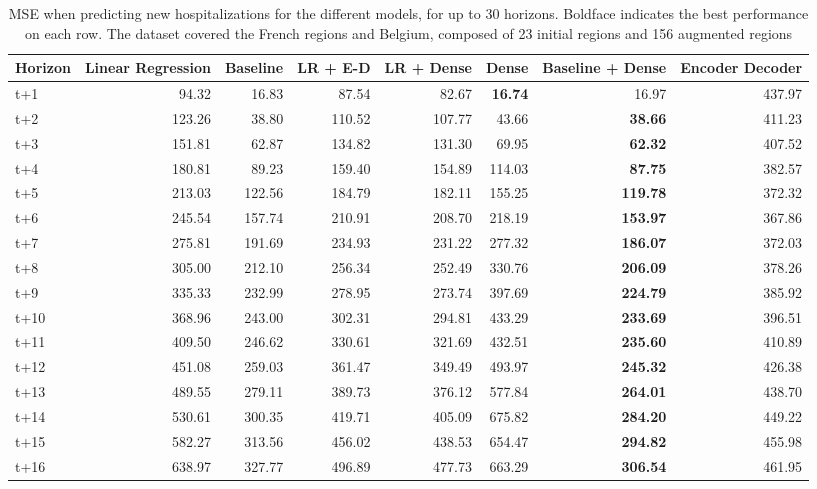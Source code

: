 \begin{table}[H]
\centering
\caption{MSE when predicting new hospitalizations for the different models, for up to 30 horizons. Boldface indicates the best performance on each row. The dataset covered the French regions and Belgium, composed of 23 initial regions and 156 augmented regions }
\label{tab:MSE_comparison}
\begin{tabular}{lrrrrrrr}
\toprule
Horizon &  Linear Regression &  Baseline &  LR + E-D &  LR + Dense &   Dense &  Baseline + Dense &  Encoder Decoder \\
\midrule
t+1  & 94.32  & 16.83  & 87.54  & 82.67  & \textbf{16.74}  & 16.97  & 437.97  \\
t+2  & 123.26  & 38.80  & 110.52  & 107.77  & 43.66  & \textbf{38.66}  & 411.23  \\
t+3  & 151.81  & 62.87  & 134.82  & 131.30  & 69.95  & \textbf{62.32}  & 407.52  \\
t+4  & 180.81  & 89.23  & 159.40  & 154.89  & 114.03  & \textbf{87.75}  & 382.57  \\
t+5  & 213.03  & 122.56  & 184.79  & 182.11  & 155.25  & \textbf{119.78}  & 372.32  \\
t+6  & 245.54  & 157.74  & 210.91  & 208.70  & 218.19  & \textbf{153.97}  & 367.86  \\
t+7  & 275.81  & 191.69  & 234.93  & 231.22  & 277.32  & \textbf{186.07}  & 372.03  \\
t+8  & 305.00  & 212.10  & 256.34  & 252.49  & 330.76  & \textbf{206.09}  & 378.26  \\
t+9  & 335.33  & 232.99  & 278.95  & 273.74  & 397.69  & \textbf{224.79}  & 385.92  \\
t+10  & 368.96  & 243.00  & 302.31  & 294.81  & 433.29  & \textbf{233.69}  & 396.51  \\
t+11  & 409.50  & 246.62  & 330.61  & 321.69  & 432.51  & \textbf{235.60}  & 410.89  \\
t+12  & 451.08  & 259.03  & 361.47  & 349.49  & 493.97  & \textbf{245.32}  & 426.38  \\
t+13  & 489.55  & 279.11  & 389.73  & 376.12  & 577.84  & \textbf{264.01}  & 438.70  \\
t+14  & 530.61  & 300.35  & 419.71  & 405.09  & 675.82  & \textbf{284.20}  & 449.22  \\
t+15  & 582.27  & 313.56  & 456.02  & 438.53  & 654.47  & \textbf{294.82}  & 455.98  \\
t+16  & 638.97  & 327.77  & 496.89  & 477.73  & 663.29  & \textbf{306.54}  & 461.95  \\

\end{tabular}
\end{table}
